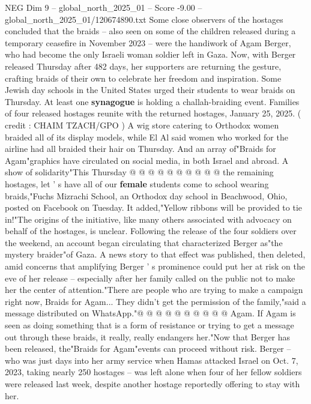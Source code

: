 \begin{textsample}{NEG Dim 9 – global\_north\_2025\_01 – Score -9.00 – global\_north\_2025\_01/120674890.txt}  \label{ex:f9_neg_030}
Some close observers of the hostages concluded that the braids -- also seen on some of the children released during a temporary ceasefire in November 2023 -- were the handiwork of Agam Berger, who had become the only Israeli woman soldier left in Gaza.
Now, with Berger released Thursday after 482 days, her supporters are returning the gesture, crafting braids of their own to celebrate her freedom and inspiration.
Some Jewish day schools in the United States urged their students to wear braids on Thursday.
At least one \textbf{synagogue} is holding a challah-braiding event.
Families of four released hostages reunite with the returned hostages, January 25, 2025. ( credit : CHAIM TZACH/GPO ) A wig store catering to Orthodox women braided all of its display models, while El Al said women who worked for the airline had all braided their hair on Thursday.
And an array of"Braids for Agam"graphics have circulated on social media, in both Israel and abroad.
A show of solidarity"This Thursday @ @ @ @ @ @ @ @ @ @ the remaining hostages, let ' s have all of our \textbf{female} students come to school wearing braids,"Fuchs Mizrachi School, an Orthodox day school in Beachwood, Ohio, posted on Facebook on Tuesday.
It added,"Yellow ribbons will be provided to tie in!"The origins of the initiative, like many others associated with advocacy on behalf of the hostages, is unclear.
Following the release of the four soldiers over the weekend, an account began circulating that characterized Berger as"the mystery braider"of Gaza.
A news story to that effect was published, then deleted, amid concerns that amplifying Berger ' s prominence could put her at risk on the eve of her release -- especially after her family called on the public not to make her the center of attention."There are people who are trying to make a campaign right now, Braids for Agam...
They didn't get the permission of the family,"said a message distributed on WhatsApp."@ @ @ @ @ @ @ @ @ @ Agam.
If Agam is seen as doing something that is a form of resistance or trying to get a message out through these braids, it really, really endangers her."Now that Berger has been released, the"Braids for Agam"events can proceed without risk.
Berger -- who was just days into her army service when Hamas attacked Israel on Oct. 7, 2023, taking nearly 250 hostages -- was left alone when four of her fellow soldiers were released last week, despite another hostage reportedly offering to stay with her.

\end{textsample}
